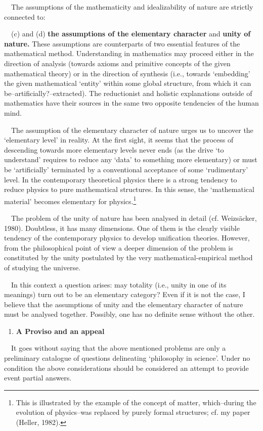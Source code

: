 \documentclass[a4paper]{article}
\begin{document}
\ \ The assumptions of the mathematicity and idealizability of nature are strictly connected to:

\ \ (c) and (d) \textbf{the assumptions of the elementary character }and\textbf{ unity of nature.} These assumptions are
counterparts of two essential features of the mathematical method. Understanding in mathematics may proceed either in
the direction of analysis (towards axioms and primitive concepts of the given mathematical theory) or in the direction
of synthesis (i.e., towards ‘embedding’ the given mathematical ‘entity’ within some global structure, from which it can
be–artificially?–extracted). The reductionist and holistic explanations outside of mathematics have their sources in
the same two opposite tendencies of the human mind.

\ \ The assumption of the elementary character of nature urges us to uncover the ‘elementary level’ in reality. At the
first sight, it seems that the process of descending towards more elementary levels never ends (as the drive ‘to
understand’ requires to reduce any ‘data’ to something more elementary) or must be ‘artificially’ terminated by a
conventional acceptance of some ‘rudimentary’ level. In the contemporary theoretical physics there is a strong tendency
to reduce physics to pure mathematical structures. In this sense, the ‘mathematical material’ becomes elementary for
physics.\footnote{This is illustrated by the example of the concept of matter, which–during the evolution of
physics–was replaced by purely formal structures; cf. my paper \label{ref:RNDhQcUluq6il}(Heller, 1982).}

\ \ The problem of the unity of nature has been analysed in detail \label{ref:RNDjAhBcetsBs}(cf. Weizsäcker, 1980).
Doubtless, it has many dimensions. One of them is the clearly visible tendency of the contemporary physics to develop
unification theories. However, from the philosophical point of view a deeper dimension of the problem is constituted by
the unity postulated by the very mathematical-empirical method of studying the universe.

\ \ In this context a question arises: may totality (i.e., unity in one of its meanings) turn out to be an elementary
category? Even if it is not the case, I believe that the assumptions of unity and the elementary character of nature
must be analysed together. Possibly, one has no definite sense without the other.

\begin{enumerate}
\item {\bfseries
A Proviso and an appeal}
\end{enumerate}
\ \ It goes without saying that the above mentioned problems are only a preliminary catalogue of questions delineating
‘philosophy in science’. Under no condition the above considerations should be considered an attempt to provide event
partial answers.
\end{document}
